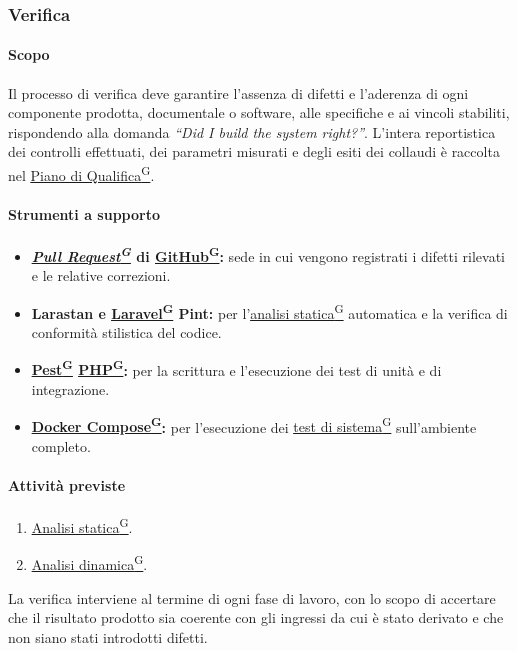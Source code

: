 \documentclass[a4paper,12pt]{article}
\providecommand{\glslink}[2]{\href{https://alittlebyte-19.github.io/Documentazione/glossario.html\#gls-#1}{\underline{#2}\textsuperscript{\scriptsize G}}}
\begin{document}
\subsubsection{Verifica}

\paragraph{Scopo}
Il processo di verifica deve garantire l'assenza di difetti e l'aderenza di ogni componente prodotta, documentale o software, alle specifiche e ai vincoli stabiliti, rispondendo alla domanda \textit{``Did I build the system right?''}. L'intera reportistica dei controlli effettuati, dei parametri misurati e degli esiti dei collaudi è raccolta nel \glslink{piano-di-qualifica}{Piano di Qualifica}.

\paragraph{Strumenti a supporto}
\begin{itemize}
    \item \textbf{\textit{\glslink{pull-request}{Pull Request}} di \glslink{github}{GitHub}:} sede in cui vengono registrati i difetti rilevati e le relative correzioni.
    \item \textbf{Larastan e \glslink{laravel}{Laravel} Pint:} per l'\glslink{analisi-statica}{analisi statica} automatica e la verifica di conformità stilistica del codice.
    \item \textbf{\glslink{pest}{Pest} \glslink{php}{PHP}:} per la scrittura e l'esecuzione dei test di unità e di integrazione.
    \item \textbf{\glslink{docker-compose}{Docker Compose}:} per l'esecuzione dei \glslink{test-di-sistema}{test di sistema} sull'ambiente completo.
\end{itemize}

\paragraph{Attività previste}
\begin{enumerate}
    \item \glslink{analisi-statica}{Analisi statica}.
    \item \glslink{analisi-dinamica}{Analisi dinamica}.
\end{enumerate}

La verifica interviene al termine di ogni fase di lavoro, con lo scopo di accertare che il risultato prodotto sia coerente con gli ingressi da cui è stato derivato e che non siano stati introdotti difetti.
\end{document}
